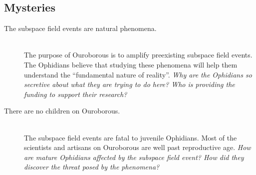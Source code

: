 \documentclass[11pt, a5paper, parskip=half-, DIV=12]{scrartcl}
\begin{document}
\subsection*{Mysteries}
\begin{description}
	\item[The subspace field events are natural phenomena.] \phantom{} \\ The purpose of Ouroborous is to amplify preexisting subspace field events. The Ophidians believe that studying these phenomena will help them understand the ``fundamental nature of reality''. \textit{Why are the Ophidians so secretive about what they are trying to do here? Who is providing the funding to support their research?}
	\item[There are no children on Ouroborous.] \phantom{a} \\The subspace field events are fatal to juvenile Ophidians. Most of the scientists and artisans on Ouroborous are well past reproductive age. \textit{How are mature Ophidians affected by the subspace field event? How did they discover the threat posed by the phenomena?}
\end{description}

\newpage



\newpage

\thispagestyle{empty}
\end{document}
